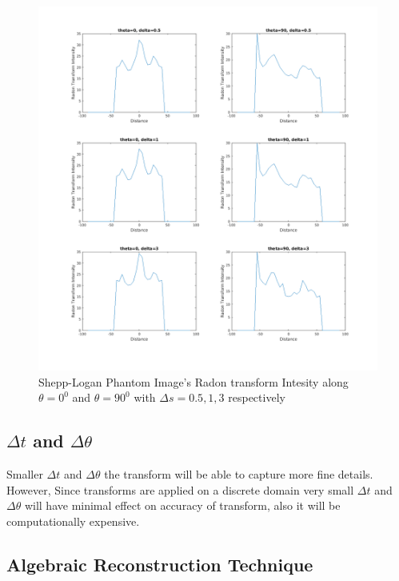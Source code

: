 \documentclass[11pt]{article}
\begin{document}
\begin{figure}[h]
\centering
\includegraphics[scale=0.4]{c2}
\caption{Shepp-Logan Phantom Image's Radon transform Intesity along $\theta=0^{0} $ and $\theta=90^{0} $ with $\Delta s = 0.5,1,3$ respectively}
\end{figure}

\subsection{$\Delta t$ and $\Delta \theta$}
Smaller $\Delta t$ and $\Delta \theta$ the transform will be able to capture more fine details. However, Since transforms are applied on a discrete domain very small $\Delta t$ and $\Delta \theta$ will have minimal effect on accuracy of transform, also it will be computationally expensive.

\subsection{Algebraic Reconstruction Technique}
\end{document}
